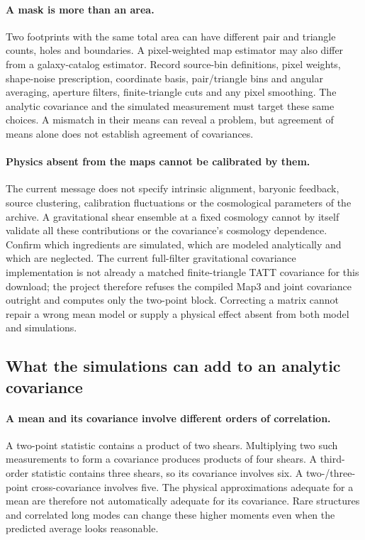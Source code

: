 \documentclass[11pt]{article}
\begin{document}
\paragraph{A mask is more than an area.}
Two footprints with the same total area can have different pair and triangle
counts, holes and boundaries. A pixel-weighted map estimator may also differ
from a galaxy-catalog estimator. Record source-bin definitions, pixel weights,
shape-noise prescription, coordinate basis, pair/triangle bins and angular
averaging, aperture filters, finite-triangle cuts and any pixel smoothing.
The analytic covariance and the simulated measurement must target these
same choices. A mismatch in their means can reveal a problem, but agreement
of means alone does not establish agreement of covariances.

\paragraph{Physics absent from the maps cannot be calibrated by them.}
The current message does not specify intrinsic alignment, baryonic feedback,
source clustering, calibration fluctuations or the cosmological parameters
of the archive. A gravitational shear ensemble at a fixed cosmology cannot
by itself validate all these contributions or the covariance's cosmology
dependence. Confirm which ingredients are simulated, which are modeled
analytically and which are neglected. The current full-filter gravitational
covariance implementation is not already a matched finite-triangle TATT
covariance for this download; the project therefore refuses the compiled
Map3 and joint covariance outright and computes only the two-point block.
Correcting a matrix cannot repair a wrong
mean model or supply a physical effect absent from both model and simulations.


\subsection{What the simulations can add to an analytic covariance}
\paragraph{A mean and its covariance involve different orders of correlation.}
A two-point statistic contains a product of two shears. Multiplying two
such measurements to form a covariance produces products of four shears.
A third-order statistic contains three shears, so its covariance involves
six. A two-/three-point cross-covariance involves five. The physical
approximations adequate for a mean are therefore not automatically
adequate for its covariance. Rare structures and correlated long modes
can change these higher moments even when the predicted average looks
reasonable.
\end{document}
